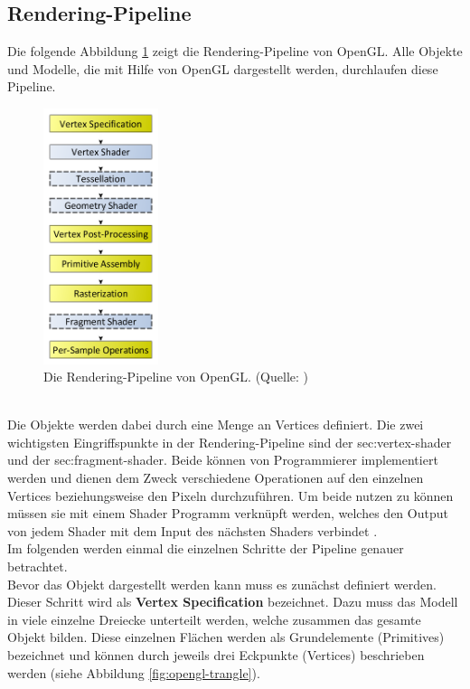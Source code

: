 \subsection{Rendering-Pipeline} Die folgende Abbildung \ref{fig:rendering-pipeline} zeigt die Rendering-Pipeline von OpenGL. Alle Objekte und Modelle, die mit Hilfe von OpenGL dargestellt werden, durchlaufen diese Pipeline. 
\begin{figure}[h!]
\centering
\includegraphics[width=0.3\textwidth]{Abbildungen/rendering-pipeline-opengl.png}
\caption[OpenGL Rendering Pipline]{Die Rendering-Pipeline von OpenGL. (Quelle: \citet{khronos:rendering-pipeline})}
\label{fig:rendering-pipeline}
\end{figure}\\
Die Objekte werden dabei durch eine Menge an Vertices definiert. Die zwei wichtigsten Eingriffspunkte in der Rendering-Pipeline sind der sec:vertex-shader und der sec:fragment-shader. Beide können von Programmierer implementiert werden und dienen dem Zweck verschiedene Operationen auf den einzelnen Vertices beziehungsweise den Pixeln durchzuführen. Um beide nutzen zu können müssen sie mit einem Shader Programm verknüpft werden, welches den Output von jedem Shader mit dem Input des nächsten Shaders verbindet \citep{vries:learn-opengl-triangle}.\\
Im folgenden werden einmal die einzelnen Schritte der Pipeline genauer betrachtet.\\
Bevor das Objekt dargestellt werden kann muss es zunächst definiert werden. Dieser Schritt wird als \textbf{Vertex Specification} bezeichnet. Dazu muss das Modell in viele einzelne Dreiecke unterteilt werden, welche zusammen das gesamte Objekt bilden. Diese einzelnen Flächen werden als Grundelemente (Primitives) bezeichnet \citep{khronos:rendering-pipeline} und können durch jeweils drei Eckpunkte (Vertices) beschrieben werden (siehe Abbildung \ref{fig:opengl-trangle}).
